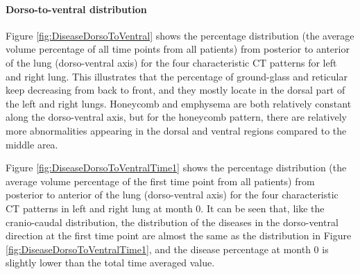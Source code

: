 \paragraph{Dorso-to-ventral distribution}
Figure \ref{fig:DiseaseDorsoToVentral} shows the percentage distribution (the average volume percentage of all time points from all patients) from posterior to anterior of the lung (dorso-ventral axis) for the four characteristic CT patterns for left and right lung. This illustrates that the percentage of ground-glass and reticular keep decreasing from back to front, and they mostly locate in the dorsal part of the left and right lungs. Honeycomb and emphysema are both relatively constant along the dorso-ventral axis, but for the honeycomb pattern, there are relatively more abnormalities appearing in the dorsal and ventral regions compared to the middle area.

Figure \ref{fig:DiseaseDorsoToVentralTime1} shows the percentage distribution (the average volume percentage of the first time point from all patients) from posterior to anterior of the lung (dorso-ventral axis) for the four characteristic CT patterns in left and right lung at month 0. It can be seen that, like the cranio-caudal distribution, the distribution of the diseases in the dorso-ventral direction at the first time point are almost the same as the distribution in Figure \ref{fig:DiseaseDorsoToVentralTime1}, and the disease percentage at month 0 is slightly lower than the total time averaged value.
\newpage

